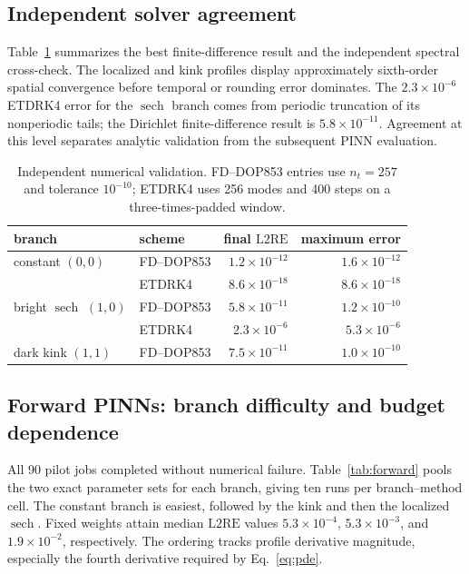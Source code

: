 \documentclass[11pt]{article}
\newcommand{\Ltwo}{\mathrm{L2RE}}
\newcommand{\sech}{\operatorname{sech}}
\begin{document}
\subsection{Independent solver agreement}

Table~\ref{tab:numerical} summarizes the best finite-difference result and the
independent spectral cross-check.  The localized and kink profiles display
approximately sixth-order spatial convergence before temporal or rounding
error dominates.  The $2.3\times10^{-6}$ ETDRK4 error for the $\sech$ branch
comes from periodic truncation of its nonperiodic tails; the Dirichlet
finite-difference result is $5.8\times10^{-11}$.  Agreement at this level
separates analytic validation from the subsequent PINN evaluation.

\begin{table}[t]
\centering
\caption{Independent numerical validation.  FD--DOP853 entries use
$n_t=257$ and tolerance $10^{-10}$; ETDRK4 uses 256 modes and 400 steps on a
three-times-padded window.}
\label{tab:numerical}
\small
\begin{tabular}{llrr}
\toprule
branch & scheme & final $\Ltwo$ & maximum error \\
\midrule
constant $(0,0)$ & FD--DOP853 & $1.2\times10^{-12}$ & $1.6\times10^{-12}$ \\
                 & ETDRK4     & $8.6\times10^{-18}$ & $8.6\times10^{-18}$ \\
bright $\sech$ $(1,0)$ & FD--DOP853 & $5.8\times10^{-11}$ & $1.2\times10^{-10}$ \\
                 & ETDRK4     & $2.3\times10^{-6}$  & $5.3\times10^{-6}$ \\
dark kink $(1,1)$ & FD--DOP853 & $7.5\times10^{-11}$ & $1.0\times10^{-10}$ \\
\bottomrule
\end{tabular}
\end{table}

\subsection{Forward PINNs: branch difficulty and budget dependence}

All 90 pilot jobs completed without numerical failure.  Table~\ref{tab:forward}
pools the two exact parameter sets for each branch, giving ten runs per
branch--method cell.  The constant branch is easiest, followed by the kink and
then the localized $\sech$.  Fixed weights attain median $\Ltwo$ values
$5.3\times10^{-4}$, $5.3\times10^{-3}$, and $1.9\times10^{-2}$, respectively.
The ordering tracks profile derivative magnitude, especially the fourth
derivative required by Eq.~\eqref{eq:pde}.
\end{document}
